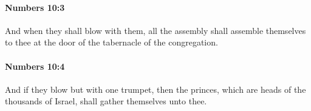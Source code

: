 		\paragraph{Numbers 10:3} %
			\label{NUMBERS-10-3}

			And when they shall blow with them, all the assembly shall assemble themselves to thee at the door of the tabernacle of the congregation.


		\paragraph{Numbers 10:4} %
			\label{NUMBERS-10-4}

			And if they blow but with one trumpet, then the princes, which are heads of the thousands of Israel, shall gather themselves unto thee.


